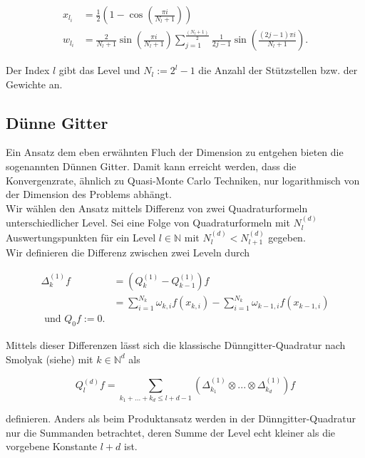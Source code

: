 \documentclass[12pt,a4paper]{scrartcl}
\numberwithin{equation}{section}
\newcommand{\N}{\mathbb{N}} %
\begin{document}
{ \begin{equation}
  \begin{split}
      x_{l_i} &= \frac{1}{2}(1- \cos(\frac{\pi i}{N_l +1})) \\
      w_{l_i} &= \frac{2}{N_l +1} \sin{(\frac{\pi i}{N_l +1})} \sum_{j = 1}^{\frac{(N_l + 1)}{2}} \frac{1}{2j -1} \sin{(\frac{(2j -1) \pi i}{N_l +1})}.
    \end{split}
 \end{equation}

 Der Index $l$ gibt das Level und $N_l := 2^l -1$ die Anzahl der Stützstellen bzw. der Gewichte an.
 
 \subsection{Dünne Gitter}
 
 Ein Ansatz dem eben erwähnten Fluch der Dimension zu entgehen bieten die sogenannten Dünnen Gitter. 
 Damit kann erreicht werden, dass die Konvergenzrate, ähnlich zu Quasi-Monte Carlo Techniken, nur
 logarithmisch von der Dimension des Problems abhängt. \\
 
 Wir wählen den Ansatz mittels Differenz von zwei Quadraturformeln unterschiedlicher Level. Sei eine 
 Folge von Quadraturformeln mit $N_l^{(d)}$ Auswertungspunkten für ein Level $l \in \N$ mit 
 $ N_l^{(d)} < N_{l+1}^{(d)}$ gegeben. \\ 
 Wir definieren die Differenz zwischen zwei Leveln durch 
 
 \begin{equation}
 \begin{split}
  \Delta_k^{(1)}f &= (Q_k^{(1)} - Q_{k-1}^{(1)})f \\ 
  &= \sum_{i=1}^{N_k} \omega_{k,i} f(x_{k,i}) - \sum_{i=1}^{N_k} \omega_{k-1,i} f(x_{k-1,i}) \\
  \text{ und } Q_0 f := 0.
  \end{split}
 \end{equation}


  Mittels dieser Differenzen lässt sich die klassische Dünngitter-Quadratur nach Smolyak (siehe) mit $k \in \N^d$
  als 
  
  \begin{equation}
   Q_l^{(d)}f = \sum_{k_1 + ... + k_d \leq l+d-1} (\Delta_{k_1}^{(1)} \otimes ... \otimes \Delta_{k_d}^{(1)}) f
  \end{equation}
  
  definieren. Anders als beim Produktansatz werden in der Dünngitter-Quadratur nur die Summanden betrachtet, 
  deren Summe der Level echt kleiner als die vorgebene Konstante $l+d$ ist. 
  
}
\end{document}
